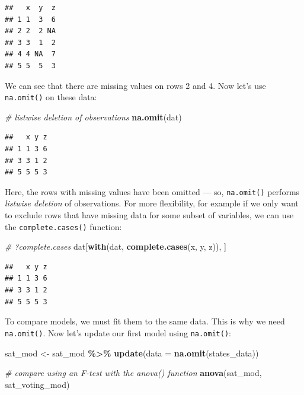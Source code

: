 \documentclass[
]{book}
\newenvironment{Shaded}{\begin{snugshade}}{\end{snugshade}}
\newcommand{\CommentTok}[1]{\textcolor[rgb]{0.56,0.35,0.01}{\textit{#1}}}
\newcommand{\DataTypeTok}[1]{\textcolor[rgb]{0.13,0.29,0.53}{#1}}
\newcommand{\KeywordTok}[1]{\textcolor[rgb]{0.13,0.29,0.53}{\textbf{#1}}}
\newcommand{\NormalTok}[1]{#1}
\newcommand{\OperatorTok}[1]{\textcolor[rgb]{0.81,0.36,0.00}{\textbf{#1}}}
\newcommand{\StringTok}[1]{\textcolor[rgb]{0.31,0.60,0.02}{#1}}
\begin{document}
\begin{verbatim}
##   x  y  z
## 1 1  3  6
## 2 2  2 NA
## 3 3  1  2
## 4 4 NA  7
## 5 5  5  3
\end{verbatim}

We can see that there are missing values on rows 2 and 4. Now let's use \texttt{na.omit()} on these data:

\begin{Shaded}
\begin{Highlighting}[]
\CommentTok{\# listwise deletion of observations}
\KeywordTok{na.omit}\NormalTok{(dat) }
\end{Highlighting}
\end{Shaded}

\begin{verbatim}
##   x y z
## 1 1 3 6
## 3 3 1 2
## 5 5 5 3
\end{verbatim}

Here, the rows with missing values have been omitted --- so, \texttt{na.omit()} performs \emph{listwise deletion} of observations. For more flexibility, for example if we only want to exclude rows that have missing data for some subset of variables, we can use the \texttt{complete.cases()} function:

\begin{Shaded}
\begin{Highlighting}[]
\CommentTok{\# ?complete.cases}
\NormalTok{dat[}\KeywordTok{with}\NormalTok{(dat, }\KeywordTok{complete.cases}\NormalTok{(x, y, z)), ]}
\end{Highlighting}
\end{Shaded}

\begin{verbatim}
##   x y z
## 1 1 3 6
## 3 3 1 2
## 5 5 5 3
\end{verbatim}

To compare models, we must fit them to the same data. This is why we need \texttt{na.omit()}.
Now let's update our first model using \texttt{na.omit()}:

\begin{Shaded}
\begin{Highlighting}[]
\NormalTok{  sat\_mod \textless{}{-}}\StringTok{ }
\StringTok{      }\NormalTok{sat\_mod }\OperatorTok{\%\textgreater{}\%}
\StringTok{      }\KeywordTok{update}\NormalTok{(}\DataTypeTok{data =} \KeywordTok{na.omit}\NormalTok{(states\_data))}

  \CommentTok{\# compare using an F{-}test with the anova() function}
  \KeywordTok{anova}\NormalTok{(sat\_mod, sat\_voting\_mod)}
\end{Highlighting}
\end{Shaded}
\end{document}

